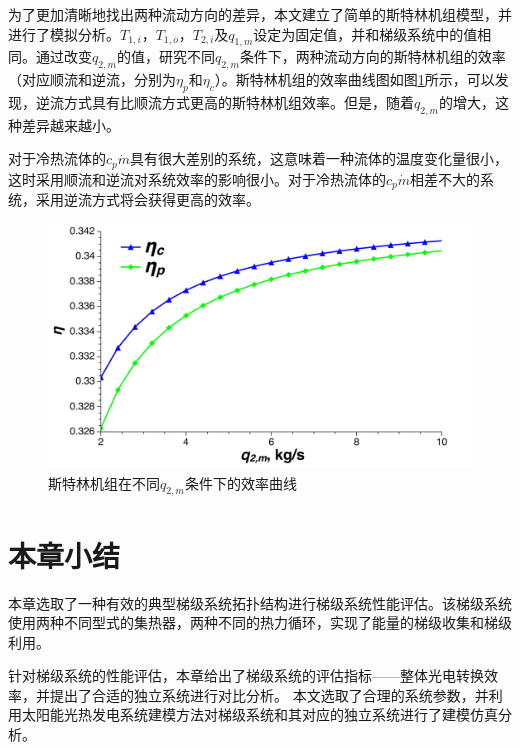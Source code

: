 为了更加清晰地找出两种流动方向的差异，本文建立了简单的斯特林机组模型，并进行了模拟分析。$T_{1,i}，T_{1,o}，T_{2,i}及q_{1,m}$设定为固定值，并和梯级系统中的值相同。通过改变$q_{2,m}$的值，研究不同$q_{2,m}$条件下，两种流动方向的斯特林机组的效率（对应顺流和逆流，分别为$\eta_p$和$\eta_c$）。斯特林机组的效率曲线图如图\ref{fig:SEAflowtypes}所示，可以发现，逆流方式具有比顺流方式更高的斯特林机组效率。但是，随着$q_{2,m}$的增大，这种差异越来越小。


对于冷热流体的$c_p\dot{m}$具有很大差别的系统，这意味着一种流体的温度变化量很小，这时采用顺流和逆流对系统效率的影响很小。对于冷热流体的$c_p\dot{m}$相差不大的系统，采用逆流方式将会获得更高的效率。

\noindent \begin{figure}[H]
\begin{center}
	\includegraphics[width = 0.8\columnwidth, angle = 0]{fig/SEAflowtypes}
	\caption{斯特林机组在不同$q_{2,m}$条件下的效率曲线}
	\label{fig:SEAflowtypes}
\end{center}
\end{figure}

\section{本章小结}

本章选取了一种有效的典型梯级系统拓扑结构进行梯级系统性能评估。该梯级系统使用两种不同型式的集热器，两种不同的热力循环，实现了能量的梯级收集和梯级利用。

针对梯级系统的性能评估，本章给出了梯级系统的评估指标——整体光电转换效率，并提出了合适的独立系统进行对比分析。
本文选取了合理的系统参数，并利用太阳能光热发电系统建模方法对梯级系统和其对应的独立系统进行了建模仿真分析。

